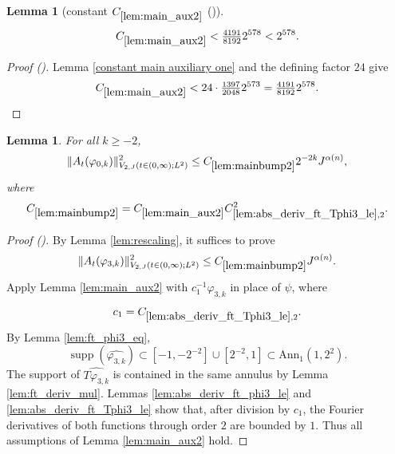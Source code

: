 \documentclass[12pt,reqno]{amsart}
\newcommand{\auto}{{({\tiny\faCar})}}
\theoremstyle{plain}
\newtheorem{lemma}[theorem]{Lemma}
\numberwithin{equation}{section}
\theoremstyle{remark}
\newcommand{\uses}[1]{}
\newcommand{\usesdefs}[1]{}
\begin{document}
\begin{lemma}[constant $C_{\ref{lem:main_aux2}}$ \auto]\label{constant main auxiliary two}\uses{constant main auxiliary one,lem:main_aux2}\usesdefs{}
\begin{equation}\label{constant main auxiliary two bound}
C_{\ref{lem:main_aux2}}<\tfrac{4191}{8192}2^{578}<2^{578}.
\end{equation}
\end{lemma}
\begin{proof}[Proof \auto]
Lemma \ref{constant main auxiliary one} and the defining factor $24$ give
\[
C_{\ref{lem:main_aux2}}
<24\cdot\tfrac{1397}{2048}2^{573}
=\tfrac{4191}{8192}2^{578}.
\]
\end{proof}

\begin{lemma}\label{lem:mainbump2}\uses{lem:rescaling,lem:main_aux2,lem:abs_deriv_ft_Tphi3_le,lem:ft_phi3_eq,lem:abs_deriv_ft_phi3_le,lem:ft_deriv_mul}\usesdefs{A_def,defn:window based bump functions}
For all $k\ge-2$,
\begin{equation}\label{mainbump2}
\|A_t(\varphi_{0,k})\|_{V_{2,J}(t\in(0,\infty);L^2)}^2
\le C_{\ref{lem:mainbump2}}2^{-2k}J^{\alpha(n)},
\end{equation}
where
\begin{equation}\label{auto:main-bump-two-constant-definition}
C_{\ref{lem:mainbump2}}
=C_{\ref{lem:main_aux2}}C_{\ref{lem:abs_deriv_ft_Tphi3_le},2}^2.
\end{equation}
\end{lemma}

\begin{proof}[Proof \auto]
By Lemma \ref{lem:rescaling}, it suffices to prove
\begin{equation}\label{mainbump2_1}
\|A_t(\varphi_{3,k})\|_{V_{2,J}(t\in(0,\infty);L^2)}^2
\le C_{\ref{lem:mainbump2}}J^{\alpha(n)}.
\end{equation}
Apply Lemma \ref{lem:main_aux2} with $c_1^{-1}\varphi_{3,k}$ in place of $\psi$, where
\[
c_1=C_{\ref{lem:abs_deriv_ft_Tphi3_le},2}.
\]
By Lemma \ref{lem:ft_phi3_eq},
\begin{equation}\label{mainbump2_supp}
\operatorname{supp}(\widehat{\varphi_{3,k}})
\subset[-1,-2^{-2}]\cup[2^{-2},1]
\subset\mathrm{Ann}_1(1,2^2).
\end{equation}
The support of $\widehat{T\varphi_{3,k}}$ is contained in the same annulus by Lemma \ref{lem:ft_deriv_mul}. Lemmas \ref{lem:abs_deriv_ft_phi3_le} and \ref{lem:abs_deriv_ft_Tphi3_le} show that, after division by $c_1$, the Fourier derivatives of both functions through order $2$ are bounded by $1$. Thus all assumptions of Lemma \ref{lem:main_aux2} hold.
\end{proof}
\end{document}
